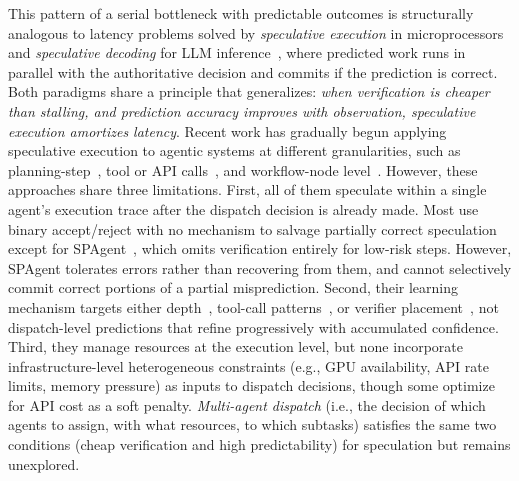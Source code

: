 \documentclass[conference,10pt]{IEEEtran}
\begin{document}
This pattern of a serial bottleneck with predictable outcomes is structurally analogous to latency problems solved by \emph{speculative execution} in microprocessors~\cite{hennessy2017computer} and \emph{speculative decoding} for LLM inference~\cite{leviathan2023fast,chen2023accelerating}, where predicted work runs in parallel with the authoritative decision and commits if the prediction is correct.
Both paradigms share a principle that generalizes: \emph{when verification is cheaper than stalling, and prediction accuracy improves with observation, speculative execution amortizes latency}.
Recent work has gradually begun applying speculative execution to agentic systems at different granularities, such as planning-step~\cite{hua2024isp,guan2025dsp}, tool or API calls~\cite{ye2025specactions,paste2026}, and workflow-node level~\cite{sherlock2025}.
However, these approaches share three limitations.
First, all of them speculate within a single agent's execution trace after the dispatch decision is already made. Most use binary accept/reject with no mechanism to salvage partially correct speculation except for SPAgent~\cite{spagent2025}, which omits verification entirely for low-risk steps. However, SPAgent tolerates errors rather than recovering from them, and cannot selectively commit correct portions of a partial misprediction.
Second, their learning mechanism targets either depth~\cite{guan2025dsp}, tool-call patterns~\cite{paste2026}, or verifier placement~\cite{sherlock2025}, not dispatch-level predictions that refine progressively with accumulated confidence.
Third, they manage resources at the execution level, but none incorporate infrastructure-level heterogeneous constraints (e.g., GPU availability, API rate limits, memory pressure) as inputs to dispatch decisions, though some optimize for API cost as a soft penalty.
\emph{Multi-agent dispatch} (i.e., the decision of which agents to assign, with what resources, to which subtasks) satisfies the same two conditions (cheap verification and high predictability) for speculation but remains unexplored.
\end{document}
